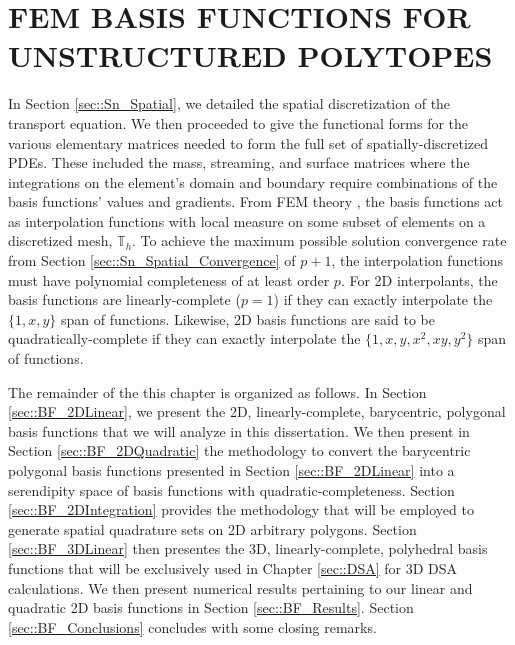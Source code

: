 %
%
%
\chapter{\uppercase {FEM Basis Functions for Unstructured Polytopes}}
\label{sec::BF}

In Section \ref{sec::Sn_Spatial}, we detailed the spatial discretization of the transport equation. We then proceeded to give the functional forms for the various elementary matrices needed to form the full set of spatially-discretized PDEs. These included the mass, streaming, and surface matrices where the integrations on the element's domain and boundary require combinations of the basis functions' values and gradients. From FEM theory \cite{ern2013theory}, the basis functions act as interpolation functions with local measure on some subset of elements on a discretized mesh, $\mathbb{T}_h$. To achieve the maximum possible solution convergence rate from Section \ref{sec::Sn_Spatial_Convergence} of $p+1$, the interpolation functions must have polynomial completeness of at least order $p$. For 2D interpolants, the basis functions are linearly-complete ($p=1$) if they can exactly interpolate the $\{ 1, x, y \}$ span of functions. Likewise, 2D basis functions are said to be quadratically-complete if they can exactly interpolate the $\{ 1, x, y, x^2, xy, y^2 \}$ span of functions.

The remainder of the this chapter is organized as follows. In Section \ref{sec::BF_2DLinear}, we present the 2D, linearly-complete, barycentric, polygonal basis functions that we will analyze in this dissertation. We then present in Section \ref{sec::BF_2DQuadratic} the methodology to convert the barycentric polygonal basis functions presented in Section \ref{sec::BF_2DLinear} into a serendipity space of basis functions with quadratic-completeness. Section \ref{sec::BF_2DIntegration} provides the methodology that will be employed to generate spatial quadrature sets on 2D arbitrary polygons. Section \ref{sec::BF_3DLinear} then presentes the 3D, linearly-complete, polyhedral basis functions that will be exclusively used in Chapter \ref{sec::DSA} for 3D DSA calculations. We then present numerical results pertaining to our linear and quadratic 2D basis functions in Section \ref{sec::BF_Results}. Section \ref{sec::BF_Conclusions} concludes with some closing remarks.

